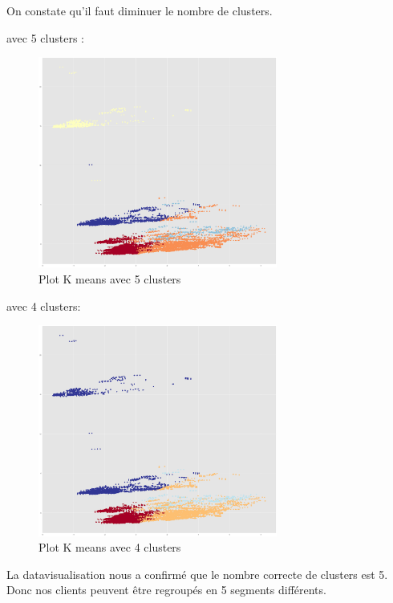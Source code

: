 \documentclass[12pt]{article}
\begin{document}
{On constate qu’il faut diminuer le nombre de clusters.

avec 5 clusters :

\begin{figure}[H]
	\centering
    \includegraphics[width=0.7\textwidth]{image37.png}
     \caption{ Plot K means avec 5 clusters}
    \label{fig:37}
\end{figure}


avec 4 clusters:

\begin{figure}[H]
	\centering
    \includegraphics[width=0.7\textwidth]{image38.png}
     \caption{ Plot K means avec 4 clusters}
    \label{fig:38}
\end{figure}


La datavisualisation nous a confirmé que le nombre correcte de clusters est 5. Donc nos clients peuvent être regroupés en 5 segments différents.


}
\end{document}
